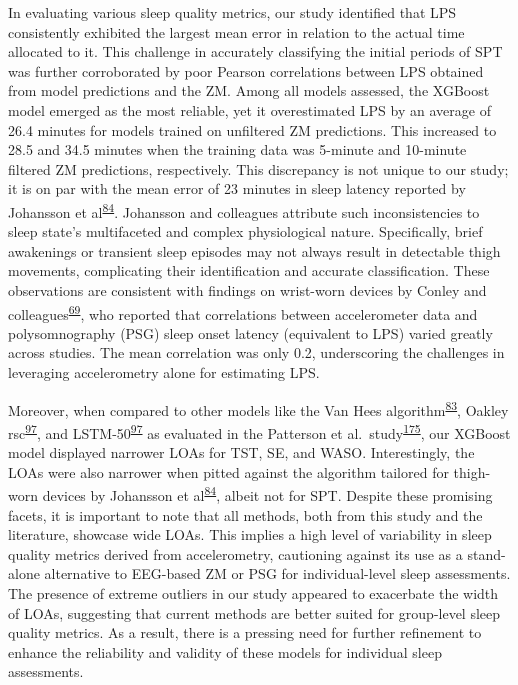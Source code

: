 \documentclass[
  10pt,
]{scrbook}
\begin{document}
In evaluating various sleep quality metrics, our study identified that
LPS consistently exhibited the largest mean error in relation to the
actual time allocated to it. This challenge in accurately classifying
the initial periods of SPT was further corroborated by poor Pearson
correlations between LPS obtained from model predictions and the ZM.
Among all models assessed, the XGBoost model emerged as the most
reliable, yet it overestimated LPS by an average of 26.4 minutes for
models trained on unfiltered ZM predictions. This increased to 28.5 and
34.5 minutes when the training data was 5-minute and 10-minute filtered
ZM predictions, respectively. This discrepancy is not unique to our
study; it is on par with the mean error of 23 minutes in sleep latency
reported by Johansson et
al\textsuperscript{\protect\hyperlink{ref-johansson_development_2023}{84}}.
Johansson and colleagues attribute such inconsistencies to sleep state's
multifaceted and complex physiological nature. Specifically, brief
awakenings or transient sleep episodes may not always result in
detectable thigh movements, complicating their identification and
accurate classification. These observations are consistent with findings
on wrist-worn devices by Conley and
colleagues\textsuperscript{\protect\hyperlink{ref-conley_agreement_2019}{69}},
who reported that correlations between accelerometer data and
polysomnography (PSG) sleep onset latency (equivalent to LPS) varied
greatly across studies. The mean correlation was only 0.2, underscoring
the challenges in leveraging accelerometry alone for estimating LPS.

Moreover, when compared to other models like the Van Hees
algorithm\textsuperscript{\protect\hyperlink{ref-hees_novel_2015}{83}},
Oakley
rsc\textsuperscript{\protect\hyperlink{ref-palotti_benchmark_2019}{97}},
and
LSTM-50\textsuperscript{\protect\hyperlink{ref-palotti_benchmark_2019}{97}}
as evaluated in the Patterson et
al.~study\textsuperscript{\protect\hyperlink{ref-patterson_40_2023}{175}},
our XGBoost model displayed narrower LOAs for TST, SE, and WASO.
Interestingly, the LOAs were also narrower when pitted against the
algorithm tailored for thigh-worn devices by Johansson et
al\textsuperscript{\protect\hyperlink{ref-johansson_development_2023}{84}},
albeit not for SPT. Despite these promising facets, it is important to
note that all methods, both from this study and the literature, showcase
wide LOAs. This implies a high level of variability in sleep quality
metrics derived from accelerometry, cautioning against its use as a
stand-alone alternative to EEG-based ZM or PSG for individual-level
sleep assessments. The presence of extreme outliers in our study
appeared to exacerbate the width of LOAs, suggesting that current
methods are better suited for group-level sleep quality metrics. As a
result, there is a pressing need for further refinement to enhance the
reliability and validity of these models for individual sleep
assessments.
\end{document}

